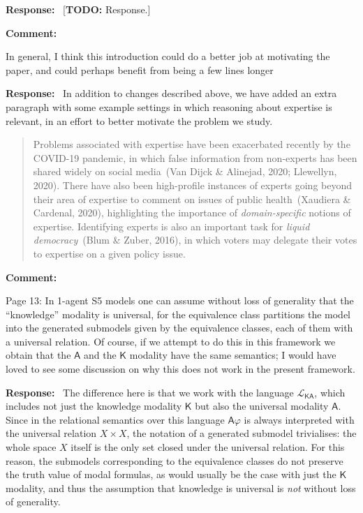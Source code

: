 \documentclass[12pt]{article}
\newcommand\todo[1]{{\color{red} [\textbf{TODO:} {#1}]}}
\newenvironment{comment}{
    \noindent\textbf{Comment:}\
    \em
}{\vspace{5mm}}
\newenvironment{response}{
    \noindent\textbf{Response:}\
}{\vspace{5mm}}
\renewcommand{\phi}{\varphi}
\newcommand{\A}{\mathsf{A}}
\newcommand{\K}{\mathsf{K}}
\begin{document}
\begin{response}
    \todo{Response.}
\end{response}

\begin{comment}
    In general, I think this introduction could do a better job at motivating
    the paper, and could perhaps benefit from being a few lines longer
\end{comment}

\begin{response}
    In addition to changes described above, we have added an extra paragraph
    with some example settings in which reasoning about expertise is relevant,
    in an effort to better motivate the problem we study.

    \begin{quotation}
        Problems associated with expertise have been exacerbated recently by
        the COVID-19 pandemic, in which false information from non-experts has
        been shared widely on social media~(Van Dijck \& Alinejad, 2020;
        Llewellyn, 2020).  There have also been high-profile instances of
        experts going beyond their area of expertise to comment on issues of
        public health~(Xaudiera \& Cardenal, 2020), highlighting the importance
        of \emph{domain-specific} notions of expertise. Identifying experts is
        also an important task for \emph{liquid democracy}~(Blum \& Zuber,
        2016), in which voters may delegate their votes to expertise on a given
        policy issue.
    \end{quotation}
\end{response}

\begin{comment}
    Page 13: In 1-agent S5 models one can assume without loss of generality
    that the ``knowledge'' modality is universal, for the equivalence class
    partitions the model into the generated submodels given by the equivalence
    classes, each of them with a universal relation. Of course, if we attempt
    to do this in this framework we obtain that the $\A$ and the
    $\K$ modality have the same semantics; I would have loved to see
    some discussion on why this does not work in the present framework.
\end{comment}

\begin{response}
    The difference here is that we work with the language $\mathcal{L}_{\K\A}$,
    which includes not just the knowledge modality $\K$ but also the universal
    modality $\A$. Since in the relational semantics over this language
    $\A\phi$ is always interpreted with the universal relation $X \times X$,
    the notation of a generated submodel trivialises: the whole space $X$
    itself is the only set closed under the universal relation. For this
    reason, the submodels corresponding to the equivalence classes do not
    preserve the truth value of modal formulas, as would usually be the case
    with just the $\K$ modality, and thus the assumption that knowledge is
    universal is \emph{not} without loss of generality.
\end{response}
\end{document}
